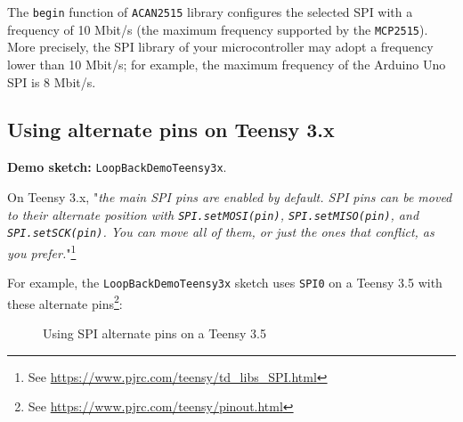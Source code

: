\documentclass[10pt, a4paper, obeyspaces, openany]{extarticle}
\newcommand \subsectionLabel[2]{\subsection{#1}\label{subsec:#2}}
\newcommand\labelFigure[1]{\label{fig:#1}}
\begin{document}
The \texttt{begin} function of \texttt{ACAN2515} library configures the selected SPI with a frequency of 10 Mbit/s (the maximum frequency supported by the \texttt{MCP2515}). More precisely, the SPI library of your microcontroller may adopt a frequency lower than 10 Mbit/s; for example, the maximum frequency of the Arduino Uno SPI is 8 Mbit/s.




\subsectionLabel{Using alternate pins on Teensy 3.x}{TeensyAlternatePins}

{\bf Demo sketch: } \texttt{LoopBackDemoTeensy3x}.

On Teensy 3.x, "\emph{the main SPI pins are enabled by default. SPI pins can be moved to their alternate position with \texttt{SPI.setMOSI(pin)}, \texttt{SPI.setMISO(pin)}, and \texttt{SPI.setSCK(pin)}. You can move all of them, or just the ones that conflict, as you prefer.}"\footnote{See \url{https://www.pjrc.com/teensy/td_libs_SPI.html}}

For example, the \texttt{LoopBackDemoTeensy3x} sketch uses \texttt{SPI0} on a Teensy 3.5 with these alternate pins\footnote{See \url{https://www.pjrc.com/teensy/pinout.html}}:
\begin{figure}[!ht]
  \small
  \centering
  \caption{Using SPI alternate pins on a Teensy 3.5}
  \labelFigure{figureHardwareSPIAlternatePins}
\end{figure}
\end{document}
